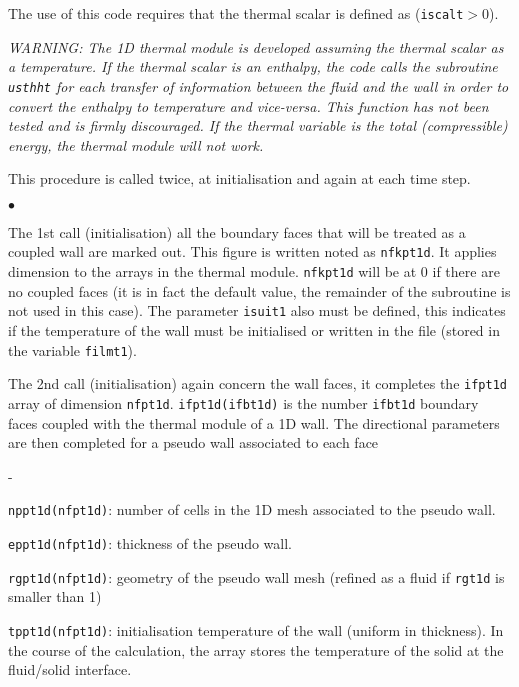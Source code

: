 {{The use of this code requires that the thermal scalar is
defined as (\texttt{iscalt}$>0$).

{\em WARNING: The 1D thermal module is developed assuming the thermal scalar
 as a temperature. If the thermal scalar is an enthalpy, the code calls the
 subroutine \texttt{usthht} for each transfer of information between the fluid
 and the wall in order to convert the enthalpy to temperature and vice-versa.
 This function has not been tested and is firmly discouraged. If the thermal
 variable is the total (compressible) energy, the thermal module will not work.}

\bigskip

This procedure  is called twice, at initialisation and again at each time step.

\begin{list}{$\bullet$}{}
\item The 1st call (initialisation) all the boundary faces that will be treated
 as a coupled wall are marked out. This figure is written noted as
 \texttt{nfkpt1d}. It applies dimension to the arrays in the thermal module.
 \texttt{nfkpt1d} will be at 0 if there are no coupled faces (it is in fact the
 default value, the remainder of the subroutine is not used in this case).
 The parameter \texttt{isuit1} also must be defined, this indicates if the
 temperature of the wall must be initialised or written in the file (stored in
 the variable \texttt{filmt1}).
\item The 2nd call (initialisation) again concern the wall faces, it completes
 the \texttt{ifpt1d} array of dimension \texttt{nfpt1d}.
 \mbox{\texttt{ifpt1d(ifbt1d)}} is the number
 \texttt{ifbt1d}\raisebox{1ex}{\small th} boundary faces coupled with the thermal module
 of a 1D wall. The directional parameters are then completed for a pseudo
 wall associated to each face
\begin{list}{-}{}
\item \texttt{nppt1d(nfpt1d)}: number of cells in the 1D mesh associated
 to the pseudo wall.
\item \texttt{eppt1d(nfpt1d)}: thickness of the pseudo wall.
\item \texttt{rgpt1d(nfpt1d)}: geometry of the pseudo wall mesh (refined
 as a fluid if \texttt{rgt1d} is smaller than 1)
\item \texttt{tppt1d(nfpt1d)}: initialisation temperature of the wall
(uniform in thickness). In the course of the calculation, the array stores the
 temperature of the solid at the fluid/solid interface.
\end{list}


\end{list}}}
